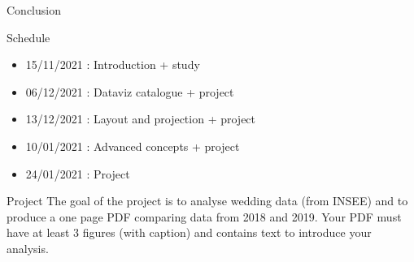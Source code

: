 \documentclass[10pt,aspectratio=169]{beamer}
\begin{document}
\begin{frame}{Conclusion}

  \begin{block}{Schedule}
    \begin{itemize}
    \item 15/11/2021 : Introduction + study
    \item 06/12/2021 : Dataviz catalogue + project
    \item 13/12/2021 : Layout and projection + project
    \item 10/01/2021 : Advanced concepts + project
    \item 24/01/2021 : Project
    \end{itemize}
  \end{block}

  \begin{block}{Project}
    \vspace{0pt} The goal of the project is to analyse wedding data
    (from INSEE) and to produce a one page PDF comparing data from
    2018 and 2019.  Your PDF must have at least 3 figures (with
    caption) and contains text to introduce your analysis.
  \end{block}
  
\end{frame}
\end{document}
